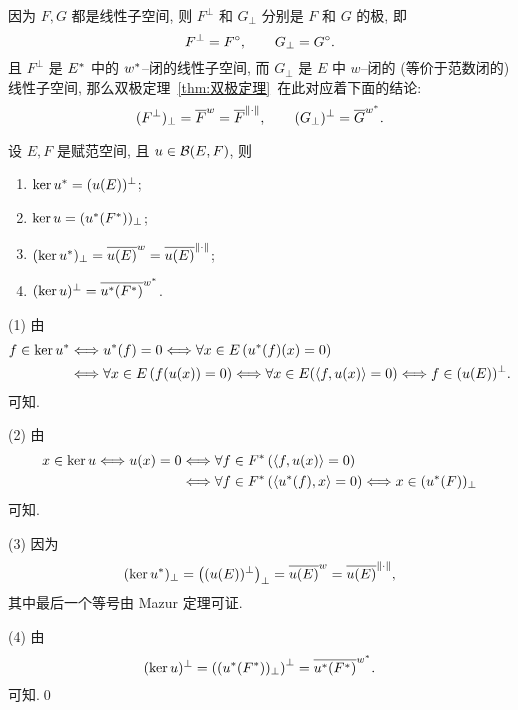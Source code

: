     \begin{Remark}
        因为 $ F, G $ 都是线性子空间, 则 $ F^{\bot} $ 和 $ G_{\bot} $ 分别是 $ F $ 和 $ G $ 的极, 即
        \[
            F^{\bot}=F^{\circ},\qquad G_{\bot}=G^{\circ}.
        \]
        且 $ F^{\bot} $ 是 $ E^{*} $ 中的 $ w^{*} $--闭的线性子空间, 而 $ G_{\bot} $ 是 $ E $ 中 $ w $--闭的 (等价于范数闭的) 线性子空间, 那么双极定理~\ref{thm:双极定理}~在此对应着下面的结论:
        \[
            (F^{\bot})_{\bot}=\overline{F}^{w}=\overline{F}^{\left\| \cdot \right\|}, \qquad (G_{\bot})^{\bot}=\overline{G}^{w^{*}}.
        \]
    \end{Remark}

    \begin{Theorem}
        设 $ E, F $ 是赋范空间, 且 $ u\in\mathcal{B}(E, F) $, 则
        \begin{enumerate}[(1)]
            \item $ \ker u^{*}=(u(E))^{\bot} $;
            \item $ \ker u=(u^{*}(F^{*}))_{\bot} $;
            \item $ (\ker u^{*})_{\bot}=\overline{u(E)}^{w}=\overline{u(E)}^{\left\| \cdot \right\|} $;
            \item $ (\ker u)^{\bot}=\overline{u^{*}(F^{*})}^{w^{*}} $.
        \end{enumerate}
    \end{Theorem}
    \begin{Proof}
        (1) 由
        \[
            \begin{aligned}
                f\in\ker u^{*} & \Longleftrightarrow u^{*}(f)=0 \Longleftrightarrow \forall x\in E\,(u^{*}(f)(x)=0)\\
                & \Longleftrightarrow \forall x\in E\,(f(u(x))=0) \Longleftrightarrow \forall x\in E(\left\langle f, u(x) \right\rangle=0)\Longleftrightarrow f\in(u(E))^{\bot}.
            \end{aligned}
        \]
        可知.

        (2) 由
        \[
            \begin{aligned}
                x\in\ker u\Longleftrightarrow u(x)=0 &  \Longleftrightarrow \forall f\in F^{*}\,(\left\langle f, u(x) \right\rangle=0)\\
                & \Longleftrightarrow \forall f\in F^{*}\,(\left\langle u^{*}(f), x \right\rangle=0)\Longleftrightarrow x\in(u^{*}(F))_{\bot}
            \end{aligned}
        \]
        可知.

        (3) 因为
        \[
            (\ker u^{*})_{\bot}=\left( (u(E))^{\bot} \right)_{\bot}=\overline{u(E)}^{w}=\overline{u(E)}^{\left\| \cdot \right\|},
        \]
        其中最后一个等号由 Mazur 定理可证.

        (4) 由
        \[
            (\ker u)^{\bot}=\left( (u^{*}(F^{*}))_{\bot} \right)^{\bot}=\overline{u^{*}(F^{*})}^{w^{*}}.
        \]
        可知.\qed
    \end{Proof}

